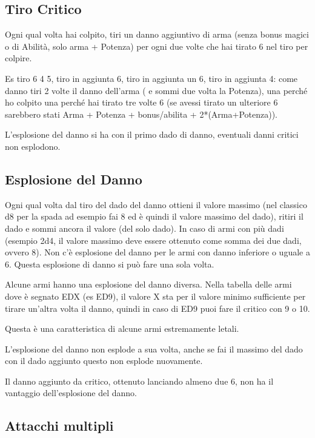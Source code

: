 \documentclass[a4paper,11pt,twoside,openany]{book}
\begin{document}
\subsection{Tiro Critico}

Ogni qual volta hai colpito, tiri un danno aggiuntivo di arma (senza bonus magici o di Abilità, solo arma + Potenza) per ogni due volte che hai tirato 6 nel tiro per colpire.

Es tiro 6 4 5, tiro in aggiunta 6, tiro in aggiunta un 6, tiro in aggiunta 4: come danno tiri 2 volte il danno dell'arma ( e sommi due volta la Potenza), una perché ho colpito una perché hai tirato tre volte 6 (se avessi tirato un ulteriore 6 sarebbero stati Arma + Potenza + bonus/abilita + 2{*}(Arma+Potenza)).

L'esplosione del danno si ha con il primo dado di danno, eventuali danni critici non esplodono.

\subsection{Esplosione del Danno}

Ogni qual volta dal tiro del dado del danno ottieni il valore massimo (nel classico d8 per la spada ad esempio fai 8 ed è quindi il valore massimo del dado), ritiri il dado e sommi ancora il valore (del solo dado). In caso di armi con più dadi (esempio 2d4, il valore massimo deve essere ottenuto come somma dei due dadi, ovvero 8). Non c'è esplosione del danno per le armi con danno inferiore o uguale a 6. Questa esplosione di danno si può fare una sola volta.

Alcune armi hanno una esplosione del danno diversa. Nella tabella delle armi dove è segnato EDX (es ED9), il valore X sta per il valore minimo sufficiente per tirare un'altra volta il danno, quindi in caso di ED9 puoi fare il critico con 9 o 10.

Questa è una caratteristica di alcune armi estremamente letali.

L'esplosione del danno non esplode a sua volta, anche se fai il massimo del dado con il dado aggiunto questo non esplode nuovamente.

Il danno aggiunto da critico, ottenuto lanciando almeno due 6, non ha il vantaggio dell'esplosione del danno.

\subsection{Attacchi multipli}
\end{document}
